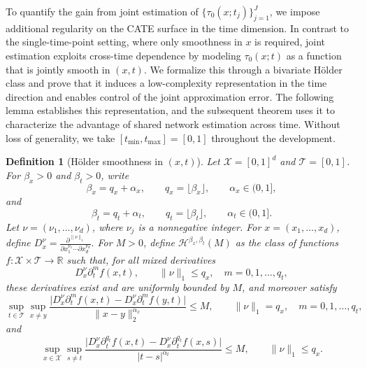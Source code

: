 \documentclass{article}
\newtheorem{definition}{Definition}
\begin{document}
 To quantify the gain from joint estimation of \(\{\tau_0(x;t_j)\}_{j=1}^J\), we impose additional regularity on the CATE surface in the time dimension. In contrast to the single-time-point setting, where only smoothness in \(x\) is required, joint estimation exploits cross-time dependence by modeling \(\tau_0(x;t)\) as a function that is jointly smooth in \((x,t)\).
We formalize this through a bivariate H\"older class and prove  that it induces a low-complexity representation in the time direction and enables control of the joint approximation error. The following lemma establishes this representation, and the subsequent theorem uses it to characterize the advantage of shared network estimation across time. Without loss of generality, we take
$[t_{\min}, t_{\max}]=[0,1]$ throughout the  development.
\begin{definition}[H\"older smoothness in \((x,t)\)]\label{def:holder_xt}
Let \(\mathcal X=[0,1]^d\) and \(\mathcal T=[0,1]\). For \(\beta_x>0\) and \(\beta_t>0\), write
\[
\beta_x = q_x+\alpha_x,
\qquad
q_x=\lfloor \beta_x\rfloor,
\qquad
\alpha_x\in(0,1],
\]
and
\[
\beta_t = q_t+\alpha_t,
\qquad
q_t=\lfloor \beta_t\rfloor,
\qquad
\alpha_t\in(0,1].
\]
Let \(\nu=(\nu_1,\ldots,\nu_d)\),  where  \(\nu_j\) is a nonnegative integer. For \(x=(x_1,\ldots,x_d)\), define
\(
D_x^\nu
=
\frac{\partial^{\|\nu\|_1}}{\partial x_1^{\nu_1}\cdots \partial x_d^{\nu_d}}.
\)
For \(M>0\), define \(\mathcal H^{\beta_x,\beta_t}(M)\) as the class of functions
\(
f:\mathcal X\times\mathcal T \to \mathbb R
\)
such that, for all mixed derivatives
\[
D_x^\nu \partial_t^m f(x,t),
\qquad \|\nu\|_1\le q_x,\quad  m=0,1,\ldots,q_t,
\]
these derivatives exist and are uniformly bounded by \(M\), and moreover satisfy
\[
\sup_{t\in\mathcal T}\sup_{x\neq y}
\frac{\big|D_x^\nu \partial_t^m f(x,t)-D_x^\nu \partial_t^m f(y,t)\big|}{\|x-y\|_2^{\alpha_x}}
\le M,
\qquad \|\nu\|_1=q_x,\quad m=0,1,\ldots,q_t, 
\]
and
\[
\sup_{x\in\mathcal X}\sup_{s\neq t}
\frac{\big|D_x^\nu \partial_t^{q_t} f(x,t)-D_x^\nu \partial_t^{q_t} f(x,s)\big|}{|t-s|^{\alpha_t}}
\le M,
\qquad \|\nu\|_1\le q_x.
\]
\end{definition}


\end{document}
